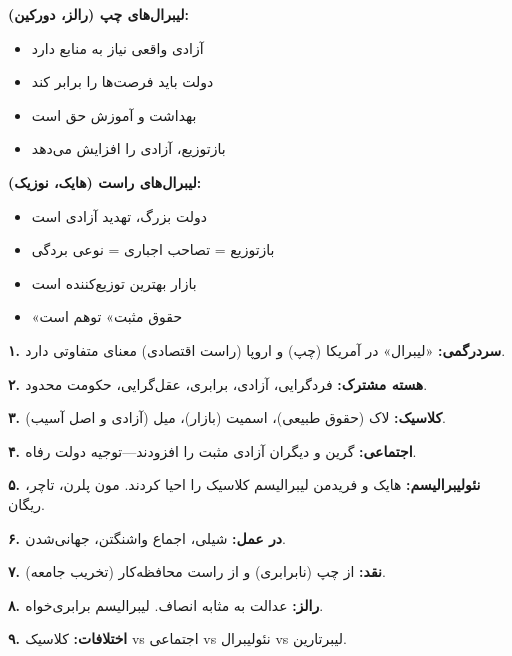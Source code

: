 \begin{debatebox}
\textbf{لیبرال‌های چپ (رالز، دورکین):}
\begin{itemize}[nosep]
    \item آزادی واقعی نیاز به منابع دارد
    \item دولت باید فرصت‌ها را برابر کند
    \item بهداشت و آموزش حق است
    \item بازتوزیع، آزادی را افزایش می‌دهد
\end{itemize}

\textbf{لیبرال‌های راست (هایک، نوزیک):}
\begin{itemize}[nosep]
    \item دولت بزرگ، تهدید آزادی است
    \item بازتوزیع = تصاحب اجباری = نوعی بردگی
    \item بازار بهترین توزیع‌کننده است
    \item «حقوق مثبت» توهم است
\end{itemize}
\end{debatebox}


\newpage

\begin{summarybox}

\textbf{۱. سردرگمی:} «لیبرال» در آمریکا (چپ) و اروپا (راست اقتصادی) معنای متفاوتی دارد.

\textbf{۲. هسته مشترک:} فردگرایی، آزادی، برابری، عقل‌گرایی، حکومت محدود.

\textbf{۳. کلاسیک:} لاک (حقوق طبیعی)، اسمیت (بازار)، میل (آزادی و اصل آسیب).

\textbf{۴. اجتماعی:} گرین و دیگران آزادی مثبت را افزودند—توجیه دولت رفاه.

\textbf{۵. نئولیبرالیسم:} هایک و فریدمن لیبرالیسم کلاسیک را احیا کردند. مون پلرن، تاچر، ریگان.

\textbf{۶. در عمل:} شیلی، اجماع واشنگتن، جهانی‌شدن.

\textbf{۷. نقد:} از چپ (نابرابری) و از راست محافظه‌کار (تخریب جامعه).

\textbf{۸. رالز:} عدالت به مثابه انصاف. لیبرالیسم برابری‌خواه.

\textbf{۹. اختلافات:} کلاسیک vs اجتماعی vs نئولیبرال vs لیبرتارین.

\end{summarybox}

